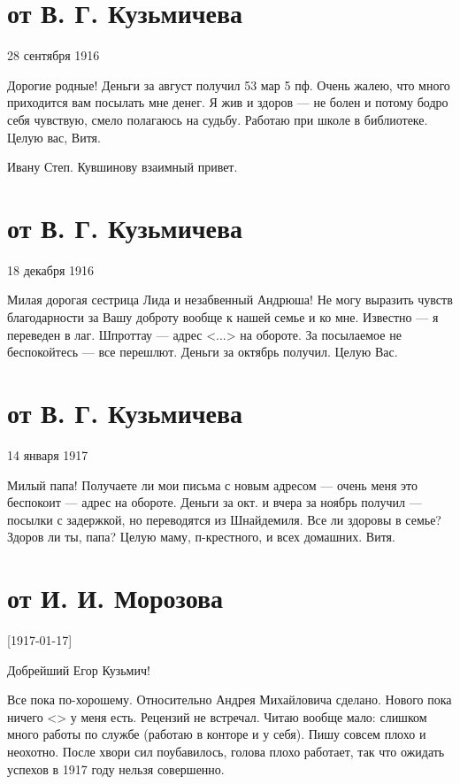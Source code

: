 \documentclass[]{memoir}
\begin{document}
\section{от В. Г. Кузьмичева}
28 сентября 1916

Дорогие родные! Деньги за август получил 53 мар 5 пф. Очень жалею, что много приходится вам посылать мне денег. Я жив и здоров — не болен и потому бодро себя чувствую, смело полагаюсь на судьбу. Работаю при школе в библиотеке. Целую вас, Витя.

Ивану Степ. Кувшинову взаимный привет.

\section{от В. Г. Кузьмичева}
18 декабря 1916

Милая дорогая сестрица Лида и незабвенный Андрюша! Не могу выразить чувств благодарности за Вашу доброту вообще к нашей семье и ко мне. Известно — я переведен в лаг. Шпроттау — адрес <...> на обороте. За посылаемое не беспокойтесь — все перешлют. Деньги за октябрь получил. Целую Вас.



\section{от В. Г. Кузьмичева}
14 января 1917

Милый папа! Получаете ли мои письма с новым адресом — очень меня это беспокоит — адрес на обороте. Деньги за окт. и вчера за ноябрь получил — посылки с задержкой, но переводятся из Шнайдемиля. Все ли здоровы в семье? Здоров ли ты, папа? Целую маму, п-крестного, и всех домашних. Витя.



\section{от И. И. Морозова}
[1917-01-17]



Добрейший Егор Кузьмич!

Все пока по-хорошему. Относительно Андрея Михайловича сделано. Нового пока ничего <> у меня есть. Рецензий не встречал.
Читаю вообще мало: слишком много работы по службе (работаю в конторе и у себя). Пишу совсем плохо и неохотно. После хвори сил поубавилось, голова плохо работает, так что ожидать успехов в 1917 году нельзя совершенно.
\end{document}
